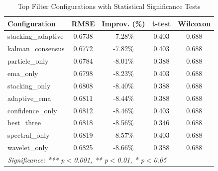 \begin{table}[htbp]
\centering
\caption{Top Filter Configurations with Statistical Significance Tests}
\label{tab:statistical-significance}
\begin{tabular}{l|c|c|c|c}
\hline
\textbf{Configuration} & \textbf{RMSE} & \textbf{Improv. (\%)} & \textbf{t-test} & \textbf{Wilcoxon} \\
\hline
stacking\_adaptive & 0.6738 & -7.28\% & 0.403 & 0.688 \\
kalman\_consensus & 0.6772 & -7.82\% & 0.403 & 0.688 \\
particle\_only & 0.6784 & -8.01\% & 0.388 & 0.688 \\
ema\_only & 0.6798 & -8.23\% & 0.403 & 0.688 \\
stacking\_only & 0.6808 & -8.40\% & 0.388 & 0.688 \\
adaptive\_ema & 0.6811 & -8.44\% & 0.388 & 0.688 \\
confidence\_only & 0.6812 & -8.46\% & 0.403 & 0.688 \\
best\_three & 0.6818 & -8.56\% & 0.346 & 0.688 \\
spectral\_only & 0.6819 & -8.57\% & 0.403 & 0.688 \\
wavelet\_only & 0.6825 & -8.66\% & 0.388 & 0.688 \\
\hline
\multicolumn{5}{l}{\textit{Significance: *** p$<$0.001, ** p$<$0.01, * p$<$0.05}} \\
\hline
\end{tabular}
\end{table}